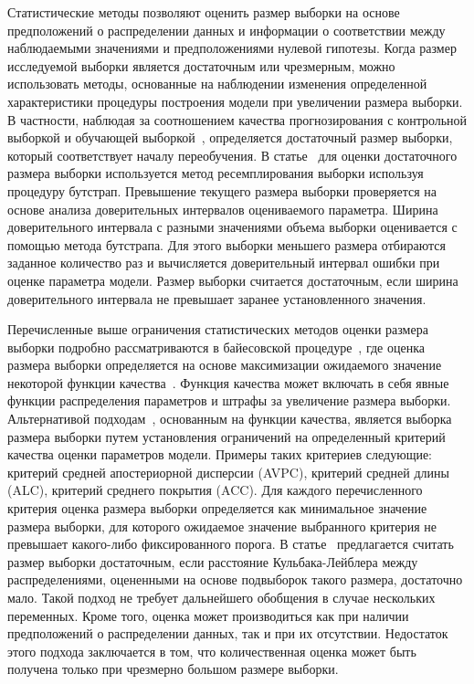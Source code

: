Статистические методы позволяют оценить размер выборки на основе предположений о распределении данных и информации о соответствии между наблюдаемыми значениями и предположениями нулевой гипотезы. Когда размер исследуемой выборки является достаточным или чрезмерным, можно использовать методы, основанные на наблюдении изменения определенной характеристики процедуры построения модели при увеличении размера выборки. В частности, наблюдая за соотношением качества прогнозирования с контрольной выборкой и обучающей выборкой~\cite{motrenko2014}, определяется достаточный размер выборки, который соответствует началу переобучения. В статье~\cite{qumsiyeh2013} для оценки достаточного размера выборки используется метод ресемплирования выборки используя процедуру бутстрап. Превышение текущего размера выборки проверяется на основе анализа доверительных интервалов оцениваемого параметра. Ширина доверительного интервала с разными значениями объема выборки оценивается с помощью метода бутстрапа. Для этого выборки меньшего размера отбираются заданное количество раз и вычисляется доверительный интервал ошибки при оценке параметра модели. Размер выборки считается достаточным, если ширина доверительного интервала не превышает заранее установленного значения.

Перечисленные выше ограничения статистических методов оценки размера выборки подробно рассматриваются в байесовской процедуре~\cite{lindley1997,rubin1998,wang2002}, где оценка размера выборки определяется на основе максимизации ожидаемого значение некоторой функции качества~\cite{lindley1997}. Функция качества может включать в себя явные функции распределения параметров и штрафы за увеличение размера выборки. Альтернативой подходам~\cite{wang2002}, основанным на функции качества, является выборка размера выборки путем установления ограничений на определенный критерий качества оценки параметров модели. Примеры таких критериев следующие: критерий средней апостериорной дисперсии (AVPC), критерий средней длины (ALC), критерий среднего покрытия (ACC). Для каждого перечисленного критерия оценка размера выборки определяется как минимальное значение размера выборки, для которого ожидаемое значение выбранного критерия не превышает какого-либо фиксированного порога. В статье~\cite{motrenko2014} предлагается считать размер выборки достаточным, если расстояние Кульбака-Лейблера между распределениями, оцененными на основе подвыборок такого размера, достаточно мало. Такой подход не требует дальнейшего обобщения в случае нескольких переменных. Кроме того, оценка может производиться как при наличии предположений о распределении данных, так и при их отсутствии. Недостаток этого подхода заключается в том, что количественная оценка может быть получена только при чрезмерно большом размере выборки.

